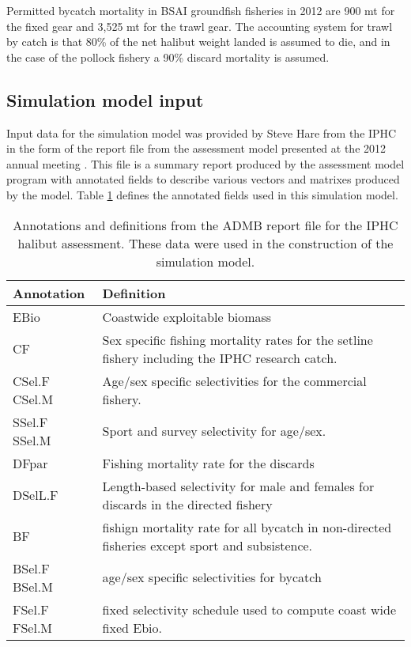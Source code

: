 Permitted bycatch mortality in BSAI groundfish fisheries in 2012 are 900 mt for the fixed gear and 3,525 mt for the trawl gear.  The accounting system for trawl by catch is that 80\% of the net halibut weight landed is assumed to die, and in the case of the pollock fishery a 90\% discard mortality is assumed.

\subsection{Simulation model input} %
\label{sub:simulation_model_input}

Input data for the simulation model was provided by Steve Hare from the IPHC in the form of the report file from the assessment model presented at the 2012 annual meeting \citep{Hare2012Rara}.  This file is a summary report produced by the assessment model program with annotated fields to describe various vectors and matrixes produced by the model.  Table \ref{tab:wobblesq.rep} defines the annotated fields used in this simulation model.

\begin{table}
	\caption{Annotations and definitions from the ADMB report file for the IPHC halibut assessment. These data were used in the construction of the simulation model.}
	\label{tab:wobblesq.rep}
	\begin{center}
	\begin{tabular}{p{2cm}p{13.5cm}}
		\hline
		\textbf{Annotation} & \textbf{Definition} \\
		\hline
		EBio & Coastwide exploitable biomass\\ \hline
		
		CF   & Sex specific fishing mortality rates for the setline fishery including the IPHC research catch.\\ \hline
		
		CSel.F  CSel.M & Age/sex specific selectivities for the commercial fishery.  \\ \hline
		
		SSel.F  SSel.M & Sport and survey selectivity for age/sex. \\ \hline
		
		DFpar   & Fishing mortality rate for the discards \\ \hline
		
		DSelL.F & Length-based selectivity for male and females for discards in the directed fishery \\ \hline
		
		BF & fishign mortality rate for all bycatch in non-directed fisheries except sport and subsistence. \\ \hline
		
		BSel.F BSel.M  & age/sex specific selectivities for bycatch\\ \hline
		
		FSel.F FSel.M  & fixed selectivity schedule used to compute coast wide fixed Ebio. \\
		\hline
	\end{tabular}
	\end{center}
\end{table}

